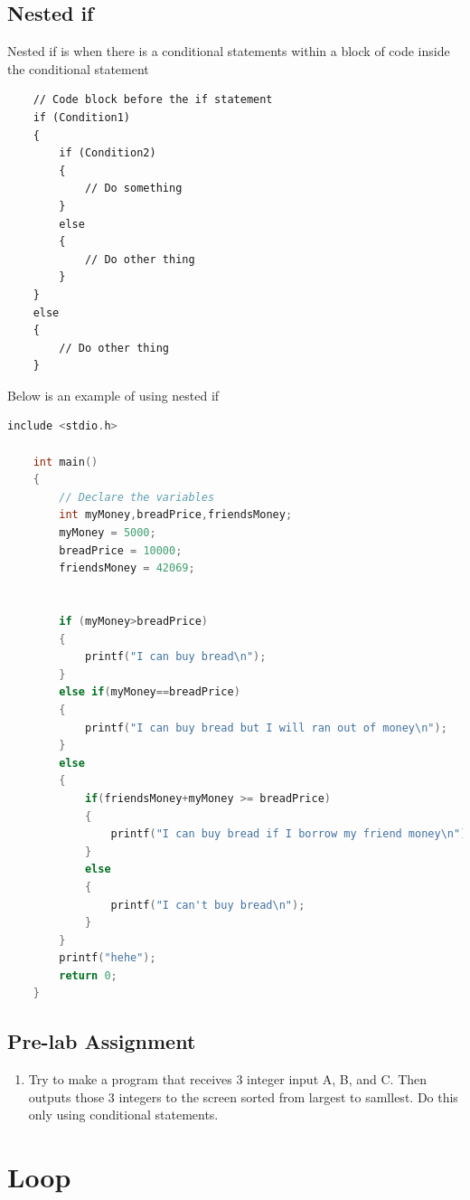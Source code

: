 \subsection{Nested if}
Nested if is when there is a conditional statements within a block of code inside the conditional statement
\begin{verbatim}
	// Code block before the if statement
	if (Condition1) 
	{
		if (Condition2)
		{
			// Do something
		}
		else
		{
			// Do other thing
		}
	} 
	else
	{
		// Do other thing
	}
\end{verbatim}

Below is an example of using nested if

\begin{lstlisting}[language=c,caption = Nested if example,label=lst:nestedifexample01]
	include <stdio.h>
	
	int main()
	{
		// Declare the variables
		int myMoney,breadPrice,friendsMoney;
		myMoney = 5000;
		breadPrice = 10000;
		friendsMoney = 42069;
		
		
		if (myMoney>breadPrice)
		{
		    printf("I can buy bread\n");
		}
		else if(myMoney==breadPrice)
		{
		    printf("I can buy bread but I will ran out of money\n");
		}
		else
		{
		    if(friendsMoney+myMoney >= breadPrice)
		    {
		        printf("I can buy bread if I borrow my friend money\n"); 
		    }
		    else
		    {
	            printf("I can't buy bread\n");	
		    }
		}
		printf("hehe");
		return 0;
	}
\end{lstlisting}


\subsection{Pre-lab Assignment}
\begin{enumerate}
	\item Try to make a program that receives 3 integer input A, B, and C. Then outputs those 3 integers to the screen sorted from largest to samllest. Do this only using conditional statements.
\end{enumerate}

\section{Loop}

